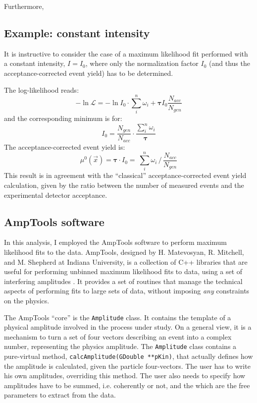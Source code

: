 \documentclass[a4paper,10pt]{report}
\begin{document}
Furthermore,

\subsection{Example: constant intensity}

It is instructive to consider the case of a maximum likelihood fit performed with a constant intensity, $I=I_0$, where only the normalization factor $I_0$ (and thus the acceptance-corrected event yield) has to be determined.

The log-likelihood reads:
\begin{equation}
-\ln{\mathcal L} =- \ln{I_0} \cdot \sum_i^n \omega_i + \boldsymbol{\tau} I_0\frac{N_{acc}}{N_{gen}}
\end{equation}
and the corresponding minimum is for:
\begin{equation}
I_0 = \frac{N_{gen}}{N_{acc}} \cdot \frac{\sum_i^n \omega_i}{\boldsymbol{\tau}}
\end{equation} 
The acceptance-corrected event yield is:
\begin{equation}
\mu^0(\vec{x}) = \boldsymbol{\tau} \cdot I_0 = \ \sum_i^n \omega_i  \, / \, \frac{N_{acc}}{N_{gen}}
\end{equation} 
This result is in agreement with the ``classical'' acceptance-corrected event yield calculation, given by the ratio between the number of measured events and the experimental detector acceptance.

\subsection{AmpTools software}
In this analysis, I employed the AmpTools software to perform maximum likelihood fits to the data.
AmpTools, designed by H. Matevosyan, R. Mitchell, and M. Shepherd at Indiana University, 
is a collection of C++ libraries that are useful for performing unbinned maximum likelihood fits to data, 
using a set of interfering amplitudes \cite{AmpTools}. 
It provides a set of routines that manage the technical aspects of performing fits to large sets of data, without imposing \textit{any} constraints on the physics.

The AmpTools ``core'' is the \texttt{Amplitude} class. 
It contains the template of a physical amplitude involved in the process under study.
 On a general view, it is a mechanism to turn a set of four vectors describing an event into a complex number, representing the physics amplitude. 
The \texttt{Amplitude} class contains a pure-virtual method, \texttt{calcAmplitude(GDouble~**pKin)}, 
that actually defines how the amplitude is calculated, given the particle four-vectors.
The user has to write his own amplitudes, overriding this method. 
The user also needs to specify how amplitudes have to be summed, i.e. coherently or not, and the which are the free parameters to extract from the data.
\end{document}

